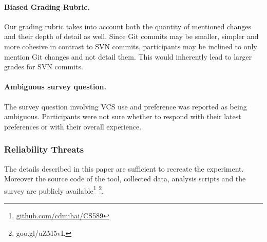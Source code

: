 \documentclass[letterpaper]{article}
\begin{document}
\paragraph{Biased Grading Rubric.}
Our grading rubric takes into account both the quantity of mentioned changes and their depth of detail as well.
Since Git commits may be smaller, simpler and more cohesive in contrast to SVN commits, participants may be inclined to only mention Git changes and not detail them.
This would inherently lead to larger grades for SVN commits.

\paragraph{Ambiguous survey question.}
The survey question involving VCS use and preference was reported as being ambiguous.
Participants were not sure whether to respond with their latest preferences or with their overall experience.

\subsubsection{Reliability Threats}

The details described in this paper are sufficient to recreate the experiment.
Moreover the source code of the tool, collected data, analysis scripts and the survey are publicly available\footnote{\url{github.com/cdmihai/CS589}} \footnote{goo.gl/uZM5vL}.
\end{document}
